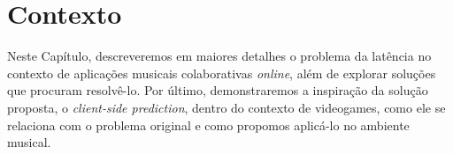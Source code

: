\chapter{Contexto}
\label{chap:context}

Neste Capítulo, descreveremos em maiores detalhes o problema da latência no contexto de aplicações musicais colaborativas \textit{online}, além de explorar soluções que procuram resolvê-lo. Por último, demonstraremos a inspiração da solução proposta, o \textit{client-side prediction}, dentro do contexto de videogames, como ele se relaciona com o problema original e como propomos aplicá-lo no ambiente musical.



